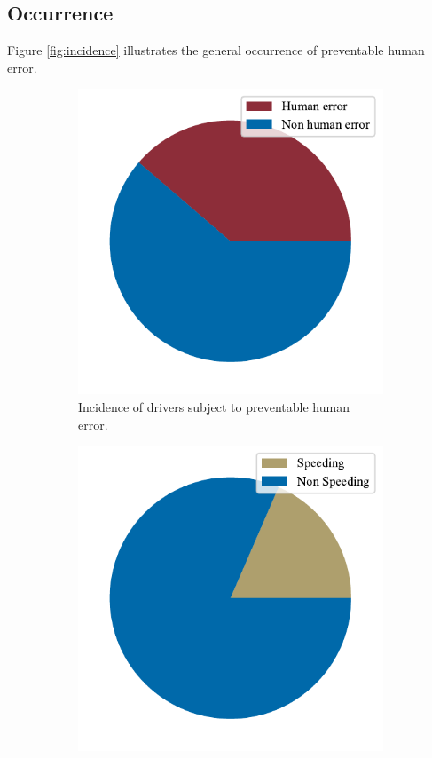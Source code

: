 \documentclass{article}
\theoremstyle{plain}
\theoremstyle{definition}
\theoremstyle{remark}
\begin{document}
\subsection{Occurrence}
Figure \ref{fig:incidence} illustrates the general occurrence of preventable human error.
\begin{figure}[ht]
	\vskip 0.2in
	\centering
		\begin{subfigure}[ht]{0.49\columnwidth}
			\includegraphics[width=\columnwidth]{plots/err-incidence-total}
			\caption{Incidence of drivers subject to preventable human error.}
			\label{fig:err-incidence-total}
		\end{subfigure}
		\hfill
		\begin{subfigure}[ht]{0.49\columnwidth}
			\includegraphics[width=\columnwidth]{plots/err-incidence-speeding}

\end{subfigure}
\end{figure}
\end{document}
